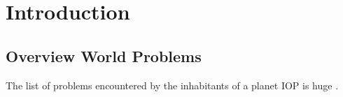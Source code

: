 \chapter{Introduction}

\section{Overview World Problems}
The list of problems encountered by the inhabitants of a planet \gls{IOP} is huge \cite{adams4242save}. 
